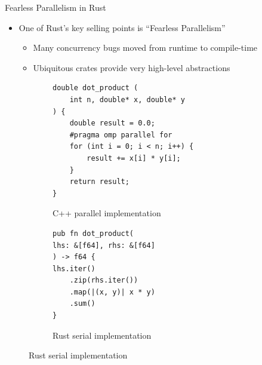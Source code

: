 \documentclass[10pt,aspectratio=169]{beamer}
\begin{document}
\begin{frame}{Fearless Parallelism in Rust}
    \begin{itemize}
        \item<1-> One of Rust's key selling points is ``Fearless Parallelism''
        \begin{itemize}
            \item Many concurrency bugs moved from runtime to compile-time
            \item Ubiquitous crates provide very high-level abstractions
        \end{itemize}
    \end{itemize}    
    \vspace*{0.15cm}

    \begin{figure}
        \begin{subfigure}[c]{.55\textwidth}\centering
            \begin{verbatim}
double dot_product (
    int n, double* x, double* y
) {
    double result = 0.0;
    #pragma omp parallel for
    for (int i = 0; i < n; i++) {
        result += x[i] * y[i];
    }
    return result;
}
            \end{verbatim}
            \label{fig:cpp-ddot-openmp-race}
            \caption{C++ parallel implementation}
             {
            }
        \end{subfigure}%
        \begin{subfigure}[c]{.45\textwidth}\centering
            \begin{verbatim}
pub fn dot_product(
lhs: &[f64], rhs: &[f64]
) -> f64 {
lhs.iter()
    .zip(rhs.iter())
    .map(|(x, y)| x * y)
    .sum()
}
            \end{verbatim}
            \label{fig:rust-ddot-serial-2}
            \vspace*{0.5cm}
            \caption{Rust serial implementation}
        \end{subfigure}
    \end{figure}
\end{frame}
\end{document}
